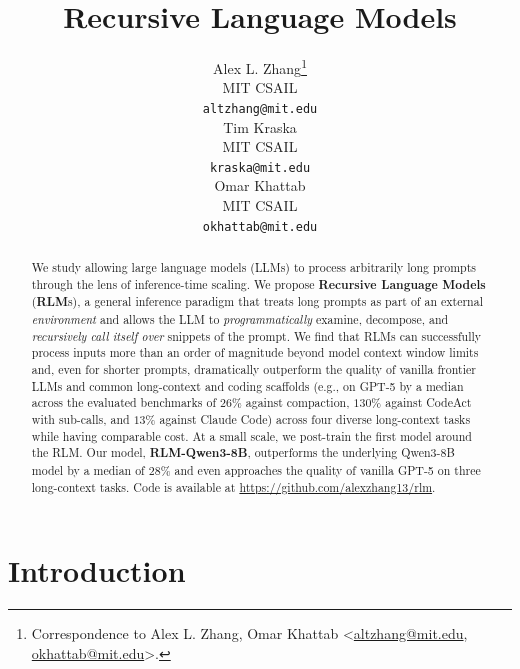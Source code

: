 \documentclass{article} %
\newcommand{\RLM}{RLM}
\begin{document}
\title{Recursive Language Models}




\author{%
  Alex L. Zhang\thanks{Correspondence to Alex L. Zhang, Omar Khattab <\url{altzhang@mit.edu}, \url{okhattab@mit.edu}>.} \\
  MIT CSAIL \\
  \texttt{altzhang@mit.edu} \\
  \And
  Tim Kraska \\
  MIT CSAIL \\
  \texttt{kraska@mit.edu} \\
  \And
  Omar Khattab \\
  MIT CSAIL \\
  \texttt{okhattab@mit.edu} \\
}

\maketitle

\begin{abstract}
We study allowing large language models (LLMs) to process arbitrarily long prompts through the lens of inference-time scaling. We propose \textbf{Recursive Language Models} (\textbf{RLM}s), a general inference paradigm that treats long prompts as part of an external \textit{environment} and allows the LLM to \textit{programmatically} examine, decompose, and \textit{recursively call itself over} snippets of the prompt. 
We find that \RLM{}s can successfully process inputs more than an order of magnitude beyond model context window limits and, even for shorter prompts, dramatically outperform the quality of vanilla frontier LLMs and common long-context and coding scaffolds (e.g., on GPT-5 by a median across the evaluated benchmarks of $26\%$ against compaction, $130\%$ against CodeAct with sub-calls, and $13\%$ against Claude Code) across four diverse long-context tasks while having comparable cost.
At a small scale, we post-train the first model around the RLM. Our model, \textbf{RLM-Qwen3-8B}, outperforms the underlying Qwen3-8B model by a median of $28\%$ and even approaches the quality of vanilla GPT-5 on three long-context tasks. Code is available at \url{https://github.com/alexzhang13/rlm}.
\end{abstract}

\section{Introduction} \label{sec1:introduction}

\end{document}
